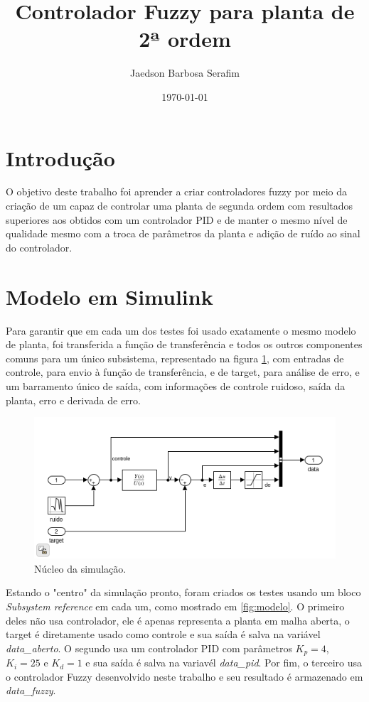 \documentclass[12pt]{article}
\title{Controlador Fuzzy para planta de 2ª ordem}
\author{Jaedson Barbosa Serafim}
\date{\today}
\begin{document}
\maketitle

\tableofcontents

\section{Introdução}

O objetivo deste trabalho foi aprender a criar controladores fuzzy por meio da criação de um capaz de controlar uma planta de segunda ordem com resultados superiores aos obtidos com um controlador PID e de manter o mesmo nível de qualidade mesmo com a troca de parâmetros da planta e adição de ruído ao sinal do controlador.

\section{Modelo em Simulink}

Para garantir que em cada um dos testes foi usado exatamente o mesmo modelo de planta, foi transferida a função de transferência e todos os outros componentes comuns para um único subsistema, representado na figura \ref{fig:FT}, com entradas de controle, para envio à função de transferência, e de target, para análise de erro, e um barramento único de saída, com informações de controle ruidoso, saída da planta, erro e derivada de erro.

\begin{figure}
  \centering
  \includegraphics{fig/FT.png}
  \caption{Núcleo da simulação.}
  \label{fig:FT}
\end{figure}

Estando o "centro" da simulação pronto, foram criados os testes usando um bloco \textit{Subsystem reference} em cada um, como mostrado em \ref{fig:modelo}. O primeiro deles não usa controlador, ele é apenas representa a planta em malha aberta, o target é diretamente usado como controle e sua saída é salva na variável \emph{data\_aberto}. O segundo usa um controlador PID com parâmetros $K_p=4$, $K_i=25$ e $K_d=1$ e sua saída é salva na variavél \emph{data\_pid}. Por fim, o terceiro usa o controlador Fuzzy desenvolvido neste trabalho e seu resultado é armazenado em \emph{data\_fuzzy}.
\end{document}
